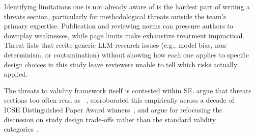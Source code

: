 
Identifying limitations one is not already aware of is the hardest part of writing a threats section, particularly for methodological threats outside the team's primary expertise. Publication and reviewing norms can pressure authors to downplay weaknesses, while page limits make exhaustive treatment impractical. Threat lists that recite generic LLM-research issues (e.g., model bias, non-determinism, or contamination) without showing how each one applies to specific design choices in this study leave reviewers unable to tell which risks actually applied.

The threats to validity framework itself is contested within SE. \citeauthor{DBLP:journals/infsof/VerdecchiaELRS23} argue that threats sections too often read as ~\cite{DBLP:journals/infsof/VerdecchiaELRS23}, \citeauthor{DBLP:conf/esem/LagoRSV24} corroborated this empirically across a decade of ICSE Distinguished Paper Award winners~\cite{DBLP:conf/esem/LagoRSV24}, and \citeauthor{DBLP:journals/tosem/RobillardAEGLNNSSS24} argue for refocusing the discussion on study design trade-offs rather than the standard validity categories~\cite{DBLP:journals/tosem/RobillardAEGLNNSSS24}.


